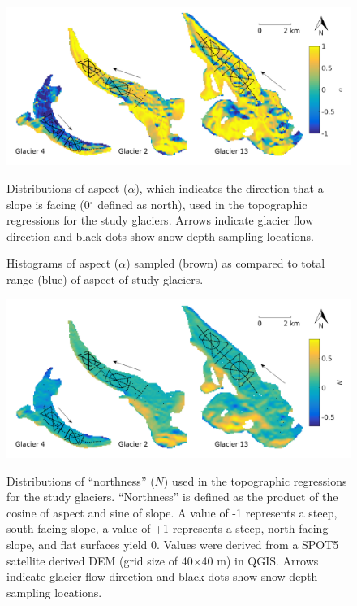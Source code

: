 \documentclass[12pt]{article}
\newcommand{\topomap}{Arrows indicate glacier flow direction and black dots show snow depth sampling locations. }
\begin{document}
\begin{figure}[H]
	\centering
	\includegraphics[width=\textwidth]{Map_aspect.png}\\
	\caption{Distributions of aspect ($\alpha$), which indicates the direction that a slope is facing (0${^\circ}$ defined as north), used in the topographic regressions for the study glaciers. \topomap}
	\label{map:aspect}
\end{figure}

\begin{figure}[H]
	\caption{Histograms of aspect ($\alpha$) sampled (brown) as compared to total range (blue) of aspect of study glaciers.}
	\label{sampledRange:aspect}
\end{figure}

\begin{figure}[H]
	\centering
	\includegraphics[width=\textwidth]{Map_northness.png}\\
	\caption{Distributions of ``northness'' ($N$) used in the topographic regressions for the study glaciers. ``Northness'' is defined as the product of the cosine of aspect and sine of slope. A value of -1 represents a steep, south facing slope, a value of +1 represents a steep, north facing slope, and flat surfaces yield 0. Values were derived from a SPOT5 satellite derived DEM (grid size of 40$\times$40 m) in QGIS. \topomap}
	\label{map:northness}
\end{figure}
\end{document}
